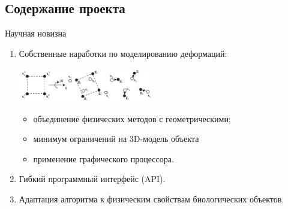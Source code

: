 \documentclass[usenames,dvipsnames,pdftex,unicode,hidelinks]{beamer}
\begin{document}
  \subsection{Содержание проекта}
  \begin{frame}{Научная новизна}
    \begin{enumerate}
      \setlength{\itemsep}{5mm}
      \item Собственные наработки по моделированию деформаций:

        \hspace{7mm}\includegraphics[height=15mm]{meshless}
        \begin{itemize}
          \item объединение физических методов с геометрическими;
          \item минимум ограничений на 3D-модель объекта
          \item применение графического процессора.
        \end{itemize}
      \item Гибкий программный интерфейс (API).
      \item Адаптация алгоритма к физическим свойствам биологических объектов.
    \end{enumerate}
  \end{frame}
\end{document}
